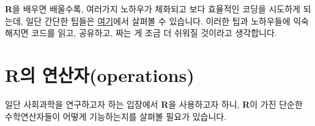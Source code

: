 \documentclass[]{book}
\begin{document}
\textbf{R}을 배우면 배울수록, 여러가지 노하우가 체화되고 보다 효율적인 코딩을 시도하게 되는데, 일단 간단한 팁들은 \href{https://google.github.io/styleguide/Rguide.xml}{여기}에서 살펴볼 수 있습니다. 이러한 팁과 노하우들에 익숙해지면 코드를 읽고, 공유하고, 짜는 게 조금 더 쉬워질 것이라고 생각합니다.

\hypertarget{ruxc758-uxc5f0uxc0b0uxc790operations}{%
\section{\texorpdfstring{\textbf{R}의 연산자(operations)}{R의 연산자(operations)}}\label{ruxc758-uxc5f0uxc0b0uxc790operations}}

일단 사회과학을 연구하고자 하는 입장에서 \textbf{R}을 사용하고자 하니, \textbf{R}이 가진 단순한 수학연산자들이 어떻게 기능하는지를 살펴볼 필요가 있습니다.
\end{document}
